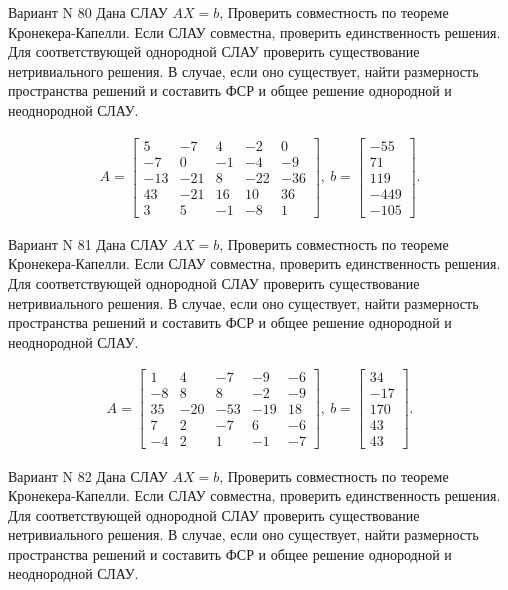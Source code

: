 \documentclass[11pt]{report}
\begin{document}
Вариант N 80
Дана СЛАУ $AX = b$,
Проверить совместность по теореме Кронекера-Капелли. Если СЛАУ совместна, проверить единственность решения.
Для соответствующей однородной СЛАУ проверить существование нетривиального решения. В случае, если оно существует,
найти размерность пространства решений и составить ФСР и общее решение однородной  и неоднородной СЛАУ.


\begin{align*}
 A = \left[\begin{matrix}5 & -7 & 4 & -2 & 0\\-7 & 0 & -1 & -4 & -9\\-13 & -21 & 8 & -22 & -36\\43 & -21 & 16 & 10 & 36\\3 & 5 & -1 & -8 & 1\end{matrix}\right],
\ b = \left[\begin{matrix}-55\\71\\119\\-449\\-105\end{matrix}\right]. 
 \end{align*}

Вариант N 81
Дана СЛАУ $AX = b$,
Проверить совместность по теореме Кронекера-Капелли. Если СЛАУ совместна, проверить единственность решения.
Для соответствующей однородной СЛАУ проверить существование нетривиального решения. В случае, если оно существует,
найти размерность пространства решений и составить ФСР и общее решение однородной  и неоднородной СЛАУ.


\begin{align*}
 A = \left[\begin{matrix}1 & 4 & -7 & -9 & -6\\-8 & 8 & 8 & -2 & -9\\35 & -20 & -53 & -19 & 18\\7 & 2 & -7 & 6 & -6\\-4 & 2 & 1 & -1 & -7\end{matrix}\right],
\ b = \left[\begin{matrix}34\\-17\\170\\43\\43\end{matrix}\right]. 
 \end{align*}

Вариант N 82
Дана СЛАУ $AX = b$,
Проверить совместность по теореме Кронекера-Капелли. Если СЛАУ совместна, проверить единственность решения.
Для соответствующей однородной СЛАУ проверить существование нетривиального решения. В случае, если оно существует,
найти размерность пространства решений и составить ФСР и общее решение однородной  и неоднородной СЛАУ.
\end{document}
